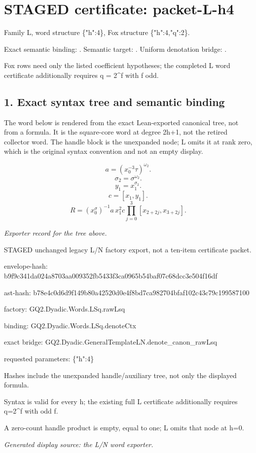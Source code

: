 \section*{STAGED certificate: packet-L-h4}
Family L, word structure \{"h":4\}, Fox structure \{"h":4,"q":2\}.

\noindent Exact semantic binding: . Semantic target: . Uniform denotation bridge: .
\par\noindent Fox rows need only the listed coefficient hypotheses; the completed L word certificate additionally requires q = 2\textasciicircum{}f with f odd.

\subsection*{1. Exact syntax tree and semantic binding}
The word below is rendered from the exact Lean-exported canonical tree, not from a formula. It is the square-core word at degree 2h+1, not the retired collector word. The handle block is the unexpanded node; L omits it at rank zero, which is the original syntax convention and not an empty display.

\[a=(x_0^{-3}\tau)^{\omega_2}.\]
\[\sigma_2=\sigma^{\omega_2}.\]
\[y_1=x_1^{\sigma_2}.\]
\[c=[x_1,y_1].\]
\[R=(x_0^\sigma)^{-1}a\,x_1^2c\prod_{j=0}^3[x_{2+2j},x_{3+2j}].\]
\par\noindent\emph{Exporter record for the tree above.}
\par\noindent STAGED unchanged legacy L/N factory export, not a ten-item certificate packet.
\par\noindent envelope-hash: b9f9c341da024a8703aa009352fb5433f3ca0965b54baf07c68dcc3e504f16df
\par\noindent ast-hash: b78e4c0d6d9f149b80a42520d0e4f8bd7ca982704bfaf102c43c79c199587100
\par\noindent factory: GQ2.Dyadic.Words.LSq.rawLsq
\par\noindent binding: GQ2.Dyadic.Words.LSq.denoteCtx
\par\noindent exact bridge: GQ2.Dyadic.GeneralTemplateLN.denote\_canon\_rawLsq
\par\noindent requested parameters: \{"h":4\}
\par\noindent Hashes include the unexpanded handle/auxiliary tree, not only the displayed formula.
\par\noindent Syntax is valid for every h; the existing full L certificate additionally requires q=2\textasciicircum{}f with odd f.
\par\noindent A zero-count handle product is empty, equal to one; L omits that node at h=0.
\par\noindent\emph{Generated display source: the L/N word exporter.}
